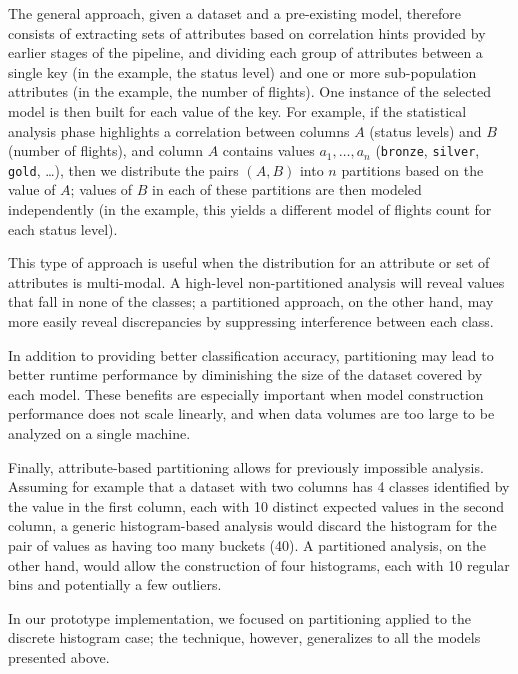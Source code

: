 The general approach, given a dataset and a pre-existing model, therefore consists of extracting sets of attributes based on correlation hints provided by earlier stages of the pipeline, and dividing each group of attributes between a single key (in the example, the status level) and one or more sub-population attributes (in the example, the number of flights). One instance of the selected model is then built for each value of the key. For example, if the statistical analysis phase highlights a correlation between columns $A$ (status levels) and $B$ (number of flights), and column $A$ contains values $a_1, \dots, a_n$ (\texttt{bronze}, \texttt{silver}, \texttt{gold}, \dots), then we distribute the pairs $(A, B)$ into $n$ partitions based on the value of $A$; values of $B$ in each of these partitions are then modeled independently (in the example, this yields a different model of flights count for each status level).

This type of approach is useful when the distribution for an attribute or set of attributes is multi-modal. A high-level non-partitioned analysis will reveal values that fall in none of the classes; a partitioned approach, on the other hand, may more easily reveal discrepancies by suppressing interference between each class.

In addition to providing better classification accuracy, partitioning may lead to better runtime performance by diminishing the size of the dataset covered by each model. These benefits are especially important when model construction performance does not scale linearly, and when data volumes are too large to be analyzed on a single machine.

Finally, attribute-based partitioning allows for previously impossible analysis. Assuming for example that a dataset with two columns has 4 classes identified by the value in the first column, each with 10 distinct expected values in the second column, a generic histogram-based analysis would discard the histogram for the pair of values as having too many buckets (40). A partitioned analysis, on the other hand, would allow the construction of four histograms, each with 10 regular bins and potentially a few outliers.

In our prototype implementation, we focused on partitioning applied to the discrete histogram case; the technique, however, generalizes to all the models presented above.
